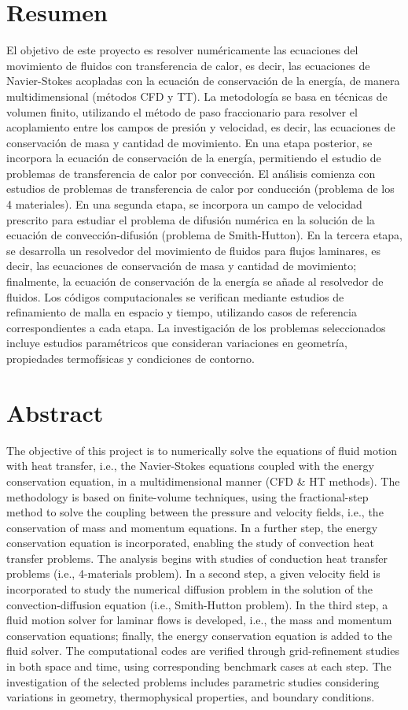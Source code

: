 \section*{Resumen}
El objetivo de este proyecto es resolver numéricamente las ecuaciones del movimiento de fluidos con transferencia de calor, es decir, las ecuaciones de Navier-Stokes acopladas con la ecuación de conservación de la energía, de manera multidimensional (métodos CFD y TT). La metodología se basa en técnicas de volumen finito, utilizando el método de paso fraccionario para resolver el acoplamiento entre los campos de presión y velocidad, es decir, las ecuaciones de conservación de masa y cantidad de movimiento. En una etapa posterior, se incorpora la ecuación de conservación de la energía, permitiendo el estudio de problemas de transferencia de calor por convección. El análisis comienza con estudios de problemas de transferencia de calor por conducción (problema de los 4 materiales). En una segunda etapa, se incorpora un campo de velocidad prescrito para estudiar el problema de difusión numérica en la solución de la ecuación de convección-difusión (problema de Smith-Hutton). En la tercera etapa, se desarrolla un resolvedor del movimiento de fluidos para flujos laminares, es decir, las ecuaciones de conservación de masa y cantidad de movimiento; finalmente, la ecuación de conservación de la energía se añade al resolvedor de fluidos. Los códigos computacionales se verifican mediante estudios de refinamiento de malla en espacio y tiempo, utilizando casos de referencia correspondientes a cada etapa. La investigación de los problemas seleccionados incluye estudios paramétricos que consideran variaciones en geometría, propiedades termofísicas y condiciones de contorno.

\section*{Abstract}
The objective of this project is to numerically solve the equations of fluid motion with heat transfer, i.e., the Navier-Stokes equations coupled with the energy conservation equation, in a multidimensional manner (CFD \& HT methods). The methodology is based on finite-volume techniques, using the fractional-step method to solve the coupling between the pressure and velocity fields, i.e., the conservation of mass and momentum equations. In a further step, the energy conservation equation is incorporated, enabling the study of convection heat transfer problems. The analysis begins with studies of conduction heat transfer problems (i.e., 4-materials problem). In a second step, a given velocity field is incorporated to study the numerical diffusion problem in the solution of the convection-diffusion equation (i.e., Smith-Hutton problem). In the third step, a fluid motion solver for laminar flows is developed, i.e., the mass and momentum conservation equations; finally, the energy conservation equation is added to the fluid solver. The computational codes are verified through grid-refinement studies in both space and time, using corresponding benchmark cases at each step. The investigation of the selected problems includes parametric studies considering variations in geometry, thermophysical properties, and boundary conditions.
